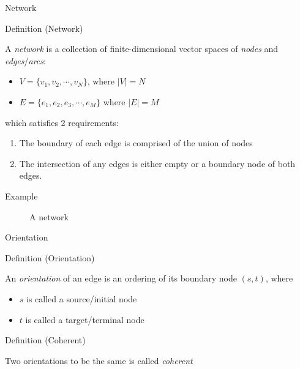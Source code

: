 \documentclass[10pt,ignorenonframetext,mathserif,onlymath]{beamer}
\providecommand{\tightlist}{%
  \setlength{\itemsep}{0pt}\setlength{\parskip}{0pt}}
\begin{document}
\begin{frame}{Network}
\protect\hypertarget{network}{}

\begin{block}{Definition (Network)}

A \emph{network} is a collection of finite-dimensional vector spaces of
\emph{nodes} and \emph{edges}/\emph{arcs}:

\begin{itemize}
\tightlist
\item
  \(V = \{v_1, v_2, \cdots, v_N \}\), where \(|V| = N\)
\item
  \(E = \{e_1, e_2, e_3, \cdots, e_M \}\) where \(|E| = M\)
\end{itemize}

which satisfies 2 requirements:

\begin{enumerate}
[1.]
\tightlist
\item
  The boundary of each edge is comprised of the union of nodes
\item
  The intersection of any edges is either empty or a boundary node of
  both edges.
\end{enumerate}

\end{block}

\end{frame}

\begin{frame}{Example}
\protect\hypertarget{example}{}

\begin{figure}[hp]
\centering

\caption{A network}%
\label{fig:network}
\end{figure}

\end{frame}

\begin{frame}{Orientation}
\protect\hypertarget{orientation}{}

\begin{block}{Definition (Orientation)}

An \emph{orientation} of an edge is an ordering of its boundary node
\((s, t)\), where

\begin{itemize}
\tightlist
\item
  \(s\) is called a source/initial node
\item
  \(t\) is called a target/terminal node
\end{itemize}

\end{block}

\begin{block}{Definition (Coherent)}

Two orientations to be the same is called \emph{coherent}

\end{block}

\end{frame}
\end{document}
